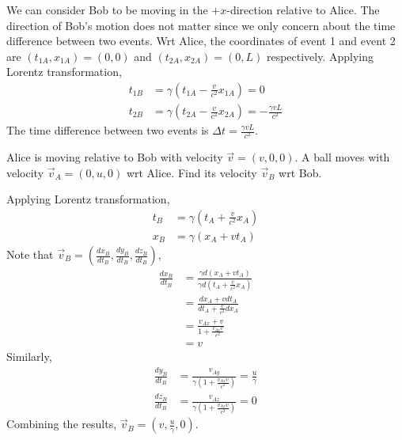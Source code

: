 \documentclass[12pt]{book} %
\numberwithin{equation}{chapter}
\def\c{\gamma}
\def\D{\Delta}
\begin{document}
\begin{solbox}
We can consider Bob to be moving in the $+x$-direction relative to Alice. The direction of Bob's motion does not matter since we only concern about the time difference between two events.\bigskip\newline
Wrt Alice, the coordinates of event 1 and event 2 are $\left(t_{1A}, x_{1A}\right)=(0,0)$ and $\left(t_{2A}, x_{2A}\right)=(0,L)$ respectively. Applying Lorentz transformation,
\begin{align*}
t_{1B}&=\c\left(t_{1A}-\frac{v}{c^{2}}x_{1A}\right)=0\\
t_{2B}&=\c\left(t_{2A}-\frac{v}{c^{2}}x_{2A}\right)=-\frac{\c vL}{c^{2}}
\end{align*}
The time difference between two events is $\D t=\frac{\c vL}{c^2}$.
\end{solbox}

\begin{problem}
Alice is moving relative to Bob with velocity $\vec{v}=(v, 0, 0)$. A ball moves with velocity $\vec{v}_{A}=(0,u,0)$ wrt Alice. Find its velocity $\vec{v}_{B}$ wrt Bob.
\end{problem}

\begin{solbox}
Applying Lorentz transformation,
\begin{align*}
t_{B}&=\c\left(t_{A}+\frac{v}{c^2}x_{A}\right)\\
x_{B}&=\c\left(x_{A}+vt_{A}\right)
\end{align*}
Note that $\vec{v}_{B}=\left(\frac{dx_{B}}{dt_{B}},\frac{dy_{B}}{dt_{B}},\frac{dz_{B}}{dt_{B}}\right)$,
\begin{align*}
\frac{dx_{B}}{dt_{B}}&=\frac{\c d\left(x_{A}+vt_{A}\right)}{\c d\left(t_{A}+\frac{v}{c^2}x_{A}\right)}\\
&=\frac{dx_{A}+vdt_{A}}{dt_{A}+\frac{v}{c^2}dx_{A}}\\
&=\frac{v_{Ax}+v}{1+\frac{v_{Ax}v}{c^2}}\\
&=v
\end{align*}
Similarly, 
\begin{align*}
\frac{dy_{B}}{dt_{B}}&=\frac{v_{Ay}}{\c\left(1+\frac{v_{Ax}v}{c^2}\right)}=\frac{u}{\c}\\
\frac{dz_{B}}{dt_{B}}&=\frac{v_{Az}}{\c\left(1+\frac{v_{Ax}v}{c^2}\right)}=0
\end{align*}
Combining the results, $\vec{v}_{B}=\left(v, \frac{u}{\c}, 0\right)$.
\end{solbox}
\end{document}

